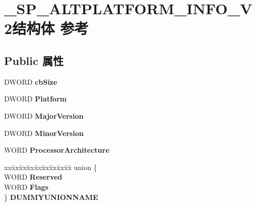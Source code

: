 \hypertarget{struct___s_p___a_l_t_p_l_a_t_f_o_r_m___i_n_f_o___v2}{}\section{\+\_\+\+S\+P\+\_\+\+A\+L\+T\+P\+L\+A\+T\+F\+O\+R\+M\+\_\+\+I\+N\+F\+O\+\_\+\+V2结构体 参考}
\label{struct___s_p___a_l_t_p_l_a_t_f_o_r_m___i_n_f_o___v2}
\subsection*{Public 属性}
\begin{DoxyCompactItemize}
\item 
\mbox{\label{struct___s_p___a_l_t_p_l_a_t_f_o_r_m___i_n_f_o___v2_a3ae680a26825c459c5a484228f2bd3fa}} 
D\+W\+O\+RD {\bfseries cb\+Size}
\item 
\mbox{\label{struct___s_p___a_l_t_p_l_a_t_f_o_r_m___i_n_f_o___v2_a999b089511ce73e2aa0e02359951c2e3}} 
D\+W\+O\+RD {\bfseries Platform}
\item 
\mbox{\label{struct___s_p___a_l_t_p_l_a_t_f_o_r_m___i_n_f_o___v2_ad99c1538756f26d078f2cef182f4c041}} 
D\+W\+O\+RD {\bfseries Major\+Version}
\item 
\mbox{\label{struct___s_p___a_l_t_p_l_a_t_f_o_r_m___i_n_f_o___v2_a446bd09e44b202ae327cccb4af2a4a46}} 
D\+W\+O\+RD {\bfseries Minor\+Version}
\item 
\mbox{\label{struct___s_p___a_l_t_p_l_a_t_f_o_r_m___i_n_f_o___v2_a2f9b1137e616abef359c10633ad57143}} 
W\+O\+RD {\bfseries Processor\+Architecture}
\item 
\mbox{\label{struct___s_p___a_l_t_p_l_a_t_f_o_r_m___i_n_f_o___v2_ab65280ca77aefc1e163b1f3d507530f3}} 
\begin{tabbing}
xx\=xx\=xx\=xx\=xx\=xx\=xx\=xx\=xx\=\kill
union \{\\
\>WORD {\bfseries Reserved}\\
\>WORD {\bfseries Flags}\\
\} {\bfseries DUMMYUNIONNAME}\\


\end{tabbing}
\end{DoxyCompactItemize}
